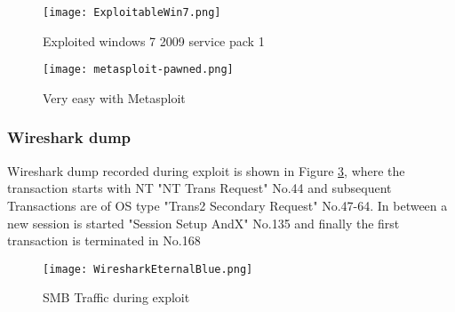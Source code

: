 \documentclass[
	letterpaper, %
	10pt, %
	unnumberedsections, %
	twoside, %
]{LTJournalArticle}
\begin{document}
\begin{appendices}
\begin{figure}[ht] %
	\texttt{[image: ExploitableWin7.png]}
	\caption{Exploited windows 7 2009 service pack 1}
	\label{fig:ExploitableWin7}
\end{figure}

\begin{figure}[ht] %
	\texttt{[image: metasploit-pawned.png]}
	\caption{Very easy with Metasploit}
	\label{fig:metasploit-pawned}
\end{figure}


\subsubsection{Wireshark dump}
Wireshark dump recorded during exploit is shown in Figure \ref{fig:wiresharkDump}, where the transaction starts with NT "NT Trans Request" No.44 and subsequent Transactions are of OS type "Trans2 Secondary Request" No.47-64. In between a new session is started "Session Setup AndX" No.135 and finally the first transaction is terminated in No.168 	     


\begin{landscape}
\begin{figure}[ht] %
	\texttt{[image: WiresharkEternalBlue.png]}
	\caption{SMB Traffic during exploit}
	\label{fig:wiresharkDump}
\end{figure}
\end{landscape}

\end{appendices}














\end{document}
